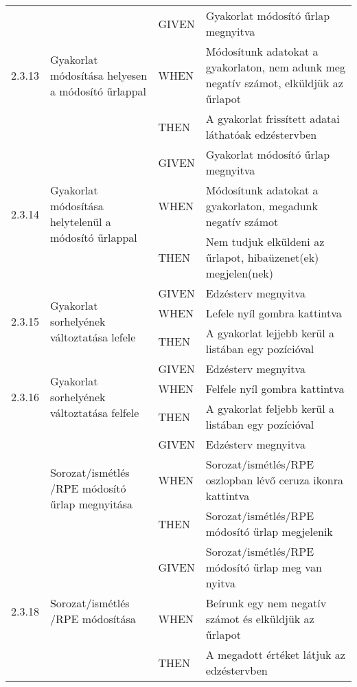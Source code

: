 \begin{center}
\begin{longtable}{ | p{} | p{} | p{} | p{} | }
			\multirow{3}{*}{2.3.13} 
			& \multirow{3}{=}{Gyakorlat módosítása helyesen a módosító űrlappal} 
			& GIVEN 
			& Gyakorlat módosító űrlap megnyitva \\
			\cline{3-4}
			& & WHEN 
			& Módosítunk adatokat a gyakorlaton, nem adunk meg negatív számot, elküldjük az űrlapot \\
			\cline{3-4}
			& & THEN 
			& A gyakorlat frissített adatai láthatóak edzéstervben \\
			\hline

			\multirow{3}{*}{2.3.14} 
			& \multirow{3}{=}{Gyakorlat módosítása helytelenül a módosító űrlappal} 
			& GIVEN 
			& Gyakorlat módosító űrlap megnyitva \\
			\cline{3-4}
			& & WHEN 
			& Módosítunk adatokat a gyakorlaton, megadunk negatív számot \\
			\cline{3-4}
			& & THEN 
			& Nem tudjuk elküldeni az űrlapot, hibaüzenet(ek) megjelen(nek) \\
			\hline

			\multirow{3}{*}{2.3.15} 
			& \multirow{3}{=}{Gyakorlat sorhelyének változtatása lefele} 
			& GIVEN 
			& Edzésterv megnyitva \\
			\cline{3-4}
			& & WHEN 
			& Lefele nyíl gombra kattintva \\
			\cline{3-4}
			& & THEN 
			& A gyakorlat lejjebb kerül a listában egy pozícióval \\
			\hline

			\multirow{3}{*}{2.3.16} 
			& \multirow{3}{=}{Gyakorlat sorhelyének változtatása felfele} 
			& GIVEN 
			& Edzésterv megnyitva \\
			\cline{3-4}
			& & WHEN 
			& Felfele nyíl gombra kattintva \\
			\cline{3-4}
			& & THEN 
			& A gyakorlat feljebb kerül a listában egy pozícióval \\
			\hline

			\pagebreak

			\multirow{3}{*}{2.3.17} 
			& \multirow{3}{=}{Sorozat/ismétlés /RPE módosító űrlap megnyitása} 
			& GIVEN 
			& Edzésterv megnyitva \\
			\cline{3-4}
			& & WHEN 
			& Sorozat/ismétlés/RPE oszlopban lévő ceruza ikonra kattintva \\
			\cline{3-4}
			& & THEN 
			& Sorozat/ismétlés/RPE módosító űrlap megjelenik \\
			\hline

			\multirow{3}{*}{2.3.18} 
			& \multirow{3}{=}{Sorozat/ismétlés /RPE módosítása} 
			& GIVEN 
			& Sorozat/ismétlés/RPE módosító űrlap meg van nyitva \\
			\cline{3-4}
			& & WHEN 
			& Beírunk egy nem negatív számot és elküldjük az űrlapot \\
			\cline{3-4}
			& & THEN 
			& A megadott értéket látjuk az edzéstervben \\
			\hline


\end{longtable}
\end{center}
